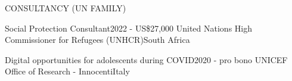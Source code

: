 \begin{rSection}{CONSULTANCY (UN FAMILY)}

\begin{rSubsection}
{Social Protection Consultant}{2022 - US\$27,000}
{United Nations High Commissioner for Refugees (UNHCR)}{South Africa}\par
\end{rSubsection}

\begin{rSubsection}
{Digital opportunities for adolescents during COVID}{2020 - pro bono}
{UNICEF Office of Research - Innocenti}{Italy}\par
\end{rSubsection}

\end{rSection}